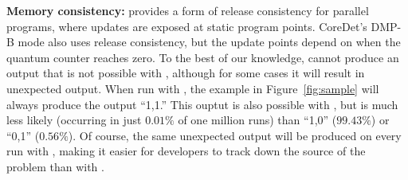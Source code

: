\textbf{Memory consistency:} \dthreads{} provides a form of release consistency
for parallel programs, where updates are exposed at static program points. 
CoreDet's DMP-B mode also uses release consistency, but the update points 
depend on when the quantum counter reaches zero.  To the best of our knowledge,
\dthreads{} cannot produce an output that is not possible with \pthreads{},
although for some cases it will result in unexpected output.  When run with
\dthreads{}, the example in Figure~\ref{fig:sample} will always produce the
output ``1,1.''  This ouptut is also possible with \pthreads{}, but is much less
likely (occurring in just $0.01\%$ of one million runs) than ``1,0'' ($99.43\%$) or ``0,1''
($0.56\%$).  Of course, the same unexpected output will be produced on every run
with \dthreads{}, making it easier for developers to track down the source
of the problem than with \pthreads{}.

